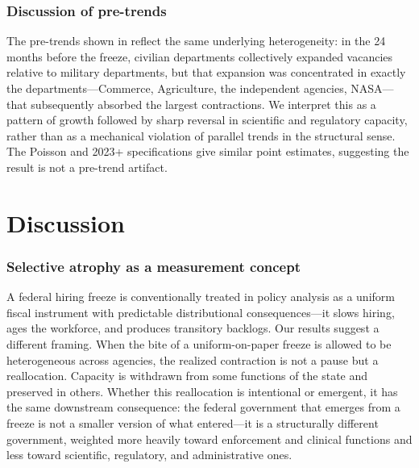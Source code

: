 \documentclass[12pt]{article}
\begin{document}
\subsubsection*{Discussion of pre-trends} The pre-trends shown in  reflect the same underlying heterogeneity: in the 24 months before the freeze, civilian departments collectively expanded vacancies relative to military departments, but that expansion was concentrated in exactly the departments---Commerce, Agriculture, the independent agencies, NASA---that subsequently absorbed the largest contractions. We interpret this as a pattern of growth followed by sharp reversal in scientific and regulatory capacity, rather than as a mechanical violation of parallel trends in the structural sense. The Poisson and 2023+ specifications give similar point estimates, suggesting the result is not a pre-trend artifact.

\section{Discussion}
\label{sec:disc}

\subsubsection*{Selective atrophy as a measurement concept} A federal hiring freeze is conventionally treated in policy analysis as a uniform fiscal instrument with predictable distributional consequences---it slows hiring, ages the workforce, and produces transitory backlogs. Our results suggest a different framing. When the bite of a uniform-on-paper freeze is allowed to be heterogeneous across agencies, the realized contraction is not a pause but a reallocation. Capacity is withdrawn from some functions of the state and preserved in others. Whether this reallocation is intentional or emergent, it has the same downstream consequence: the federal government that emerges from a freeze is not a smaller version of what entered---it is a structurally different government, weighted more heavily toward enforcement and clinical functions and less toward scientific, regulatory, and administrative ones.
\end{document}
